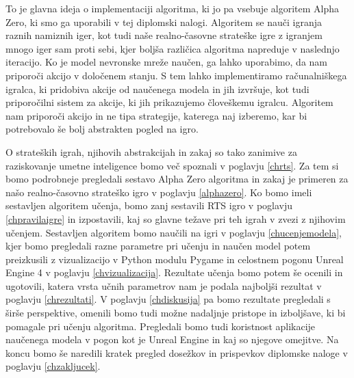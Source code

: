 \documentclass[a4paper, 12pt]{book}
\begin{document}
To je glavna ideja o implementaciji algoritma, ki jo pa vsebuje algoritem Alpha Zero, ki smo ga uporabili v tej diplomski nalogi.
Algoritem se nauči igranja raznih namiznih iger, kot tudi naše realno-časovne strateške igre z igranjem mnogo iger sam proti sebi, kjer boljša različica algoritma napreduje v naslednjo iteracijo.
Ko je model nevronske mreže naučen, ga lahko uporabimo, da nam priporoči akcijo v določenem stanju.
S tem lahko implementiramo računalniškega igralca, ki pridobiva akcije od naučenega modela in jih izvršuje, kot tudi priporočilni sistem za akcije, ki jih prikazujemo človeškemu igralcu. 
Algoritem nam priporoči akcijo in ne tipa strategije, katerega naj izberemo, kar bi potrebovalo še bolj abstrakten pogled na igro. 

O strateških igrah, njihovih abstrakcijah in zakaj so tako zanimive za raziskovanje umetne inteligence bomo več spoznali v poglavju \ref{chrts}.
Za tem si bomo podrobneje pregledali sestavo Alpha Zero algoritma in zakaj je primeren za našo realno-časovno strateško igro v poglavju \ref{alphazero}.
Ko bomo imeli sestavljen algoritem učenja, bomo zanj sestavili RTS igro v poglavju \ref{chpravilaigre} in izpostavili, kaj so glavne težave pri teh igrah v zvezi z njihovim učenjem.
Sestavljen algoritem bomo naučili na igri v poglavju \ref{chucenjemodela}, kjer bomo pregledali razne parametre pri učenju in naučen model potem preizkusili z vizualizacijo v Python modulu Pygame in celostnem pogonu Unreal Engine 4 v poglavju \ref{chvizualizacija}.
Rezultate učenja bomo potem še ocenili in ugotovili, katera vrsta učnih parametrov nam je podala najboljši rezultat v poglavju \ref{chrezultati}.
V poglavju \ref{chdiskusija} pa bomo rezultate pregledali s širše perspektive, omenili bomo tudi možne nadaljnje pristope in izboljšave, ki bi pomagale pri učenju algoritma. 
Pregledali bomo tudi koristnost aplikacije naučenega modela v pogon kot je Unreal Engine in kaj so njegove omejitve.
Na koncu bomo še naredili kratek pregled dosežkov in prispevkov diplomske naloge v poglavju \ref{chzakljucek}.

\end{document}
